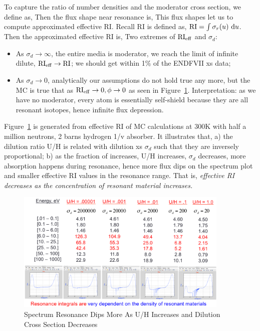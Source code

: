 \documentclass{school-22.211-notes}
\begin{document}
To capture the ratio of number densities and the moderator cross section, we define  as,
Then the flux shape near resonance is,
This flux shapes let us to compute approximated effective RI. Recall RI is defined as, $\mathrm{RI} = \int \sigma_r (u) \mbox{ }\mathrm{d} u$. Then the approximated effective RI is,
Two extremes of $\mathrm{RI}_{\mathrm{eff}}$ and $\sigma_d$:
\begin{itemize}
\item As $\sigma_d \to \infty$, the entire media is moderator, we reach the limit of infinite dilute, $\mathrm{RI}_{\mathrm{eff}} \to \mathrm{RI}$; we should get within 1\% of the ENDFVII xs data;
\item As $\sigma_d \to 0$, analytically our assumptions do not hold true any more, but the MC is true that as $\mathrm{RI}_{\mathrm{eff}} \to 0, \phi \to 0$ as seen in Figure~\ref{dilution-factor-increase}. Interpretation: as we have no moderator, every atom is essentially self-shield because they are all resonant isotopes, hence infinite flux depression.  
\end{itemize}
Figure~\ref{dilution-factor-increase} is generated from effective RI of MC calculations at 300K with half a million neutrons, 2 barns hydrogen 1/v absorber. It illustrates that, a) the dilution ratio U/H is related with dilution xs $\sigma_d$ such that they are inversely proportional; b) as the fraction of  increases, U/H increases, $\sigma_d$ decreases, more absorption happens during resonance, hence more flux dips on the spectrum plot and smaller effective RI values in the resonance range. That is, \textit{effective RI decreases as the concentration of resonant material increases.}
\begin{figure}
  \centering
  \includegraphics[width=4in]{images/dilution-factor-increase.png}
  \caption{Spectrum Resonance Dips More As U/H Increases and Dilution Cross Section Decreases} \label{dilution-factor-increase}
\end{figure}
\end{document}
